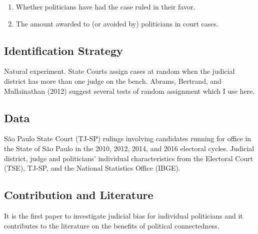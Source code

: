 \documentclass[]{article}
\begin{document}
\begin{enumerate}
\item
  Whether politicians have had the case ruled in their favor.
\item
  The amount awarded to (or avoided by) politicians in court cases.
\end{enumerate}

\hypertarget{identification-strategy}{%
\subsection{Identification Strategy}\label{identification-strategy}}

Natural experiment. State Courts assign cases at random when the
judicial district has more than one judge on the bench. Abrams,
Bertrand, and Mullainathan (2012) suggest several tests of random
assignment which I use here.

\hypertarget{data}{%
\subsection{Data}\label{data}}

São Paulo State Court (TJ-SP) rulings involving candidates running for
office in the State of São Paulo in the 2010, 2012, 2014, and 2016
electoral cycles. Judicial district, judge and politicians' individual
characteristics from the Electoral Court (TSE), TJ-SP, and the National
Statistics Office (IBGE).

\hypertarget{contribution-and-literature}{%
\subsection{Contribution and
Literature}\label{contribution-and-literature}}

It is the first paper to investigate judicial bias for individual
politicians and it contributes to the literature on the benefits of
political connectedness.
\end{document}
